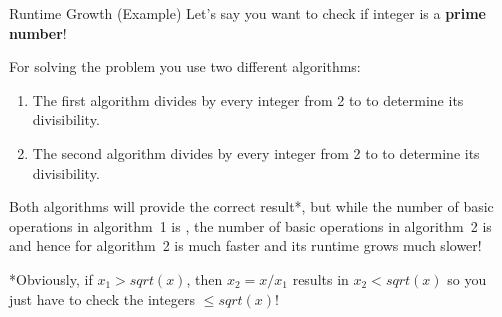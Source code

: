 \documentclass[11pt,compress,t,notes=noshow, xcolor=table]{beamer}
\begin{document}
\begin{vbframe}{Runtime Growth (Example)}
Let's say you want to check if integer  is a \textbf{prime number}!

\lz

For solving the problem you use two different algorithms:
\begin{enumerate}
  \item The first algorithm divides  by every integer from 2 to  to determine its divisibility.
  \item The second algorithm divides  by every integer from 2 to  to determine its divisibility.
\end{enumerate}

\lz

Both algorithms will provide the correct result*, but while the number of basic operations in algorithm~1 is , the number of basic operations in algorithm~2 is  and hence for  algorithm~2 is much faster and its runtime grows much slower!

\lz

\begin{footnotesize}
*Obviously, if $x_1 > sqrt(x)$, then $x_2 = x / x_1$ results in $x_2 < sqrt(x)$ so you just have to check the integers $\le sqrt(x)$!
\end{footnotesize}

\end{vbframe}


\endlecture
\end{document}
